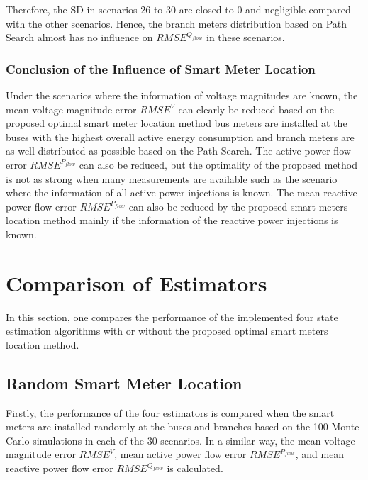 Therefore, the SD in scenarios 26 to 30 are closed to 0 and negligible compared with the other scenarios. Hence, the branch meters distribution based on Path Search almost has no influence on $RMSE^{Q_{flow}}$ in these scenarios.

\subsubsection{Conclusion of the Influence of Smart Meter Location}
 Under the scenarios where the information of voltage magnitudes are known, the mean voltage magnitude error $RMSE^{V}$ can clearly be reduced based on the proposed optimal smart meter location method bus meters are installed at the buses with the highest overall active energy consumption and branch meters are as well distributed as possible based on the Path Search. The active power flow error $RMSE^{P_{flow}}$ can also be reduced, but the optimality of the proposed method is not as strong when many measurements are available such as the scenario where the information of all active power injections is known. The mean reactive power flow error $RMSE^{P_{flow}}$ can also be reduced by the proposed smart meters location method mainly if the information of the reactive power injections is known.

\section{Comparison of Estimators}
In this section, one compares the performance of the implemented four state estimation algorithms with or without the proposed optimal smart meters location method. 
\subsection{Random Smart Meter Location}
Firstly, the performance of the four estimators is compared when the smart meters are installed randomly at the buses and branches based on the 100 Monte-Carlo simulations in each of the 30 scenarios. In a similar way, the mean voltage magnitude error $RMSE^V$, mean active power flow error $RMSE^{P_{flow}}$, and mean reactive power flow error $RMSE^{Q_{flow}}$ is calculated.
